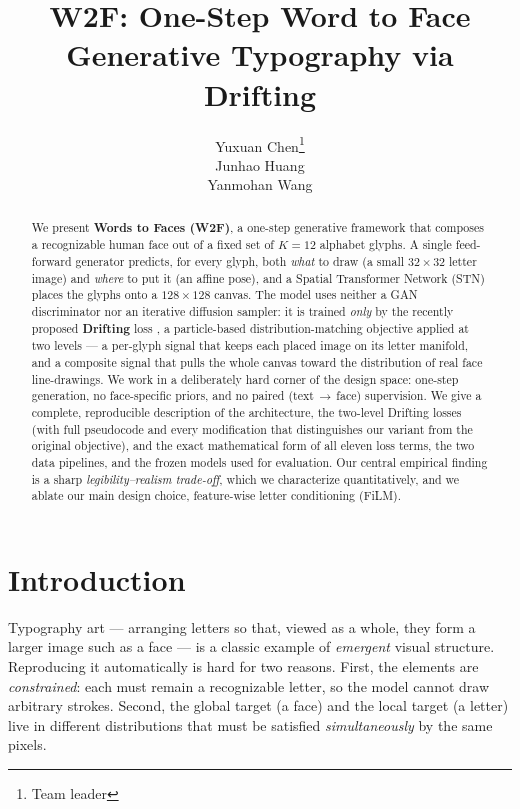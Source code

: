 \documentclass{article}
\title{W2F: One-Step Word to Face Generative Typography via Drifting}
\author{%
  Yuxuan Chen\thanks{Team leader} \\
  \And
  Junhao Huang \\
  \And
  Yanmohan Wang \\
}
\begin{document}
\maketitle

\begin{abstract}
We present \textbf{Words to Faces (W2F)}, a one-step generative framework that composes a
recognizable human face out of a fixed set of $K{=}12$ alphabet glyphs. A single feed-forward
generator predicts, for every glyph, both \emph{what} to draw (a small $32{\times}32$ letter image) and
\emph{where} to put it (an affine pose), and a Spatial Transformer Network (STN) places the glyphs onto
a $128{\times}128$ canvas. The model uses neither a GAN discriminator nor an iterative diffusion
sampler: it is trained \emph{only} by the recently proposed \textbf{Drifting} loss
\citep{lambert2026drifting}, a particle-based distribution-matching objective applied at two levels ---
a per-glyph signal that keeps each placed image on its letter manifold, and a composite signal that
pulls the whole canvas toward the distribution of real face line-drawings. We work in a deliberately
hard corner of the design space: one-step generation, no face-specific priors, and no paired
(text\,$\to$\,face) supervision. We give a complete, reproducible description of the architecture, the
two-level Drifting losses (with full pseudocode and every modification that distinguishes our variant
from the original objective), and the exact mathematical form of all eleven loss terms, the two data
pipelines, and the frozen models used for evaluation. Our central empirical finding is a sharp
\emph{legibility--realism trade-off}, which we characterize quantitatively, and we ablate our main
design choice, feature-wise letter conditioning (FiLM).
\end{abstract}

\section{Introduction}
\label{sec:intro}
Typography art --- arranging letters so that, viewed as a whole, they form a larger image such as a
face --- is a classic example of \emph{emergent} visual structure. Reproducing it automatically is
hard for two reasons. First, the elements are \emph{constrained}: each must remain a recognizable
letter, so the model cannot draw arbitrary strokes. Second, the global target (a face) and the local
target (a letter) live in different distributions that must be satisfied \emph{simultaneously} by the
same pixels.
\end{document}
